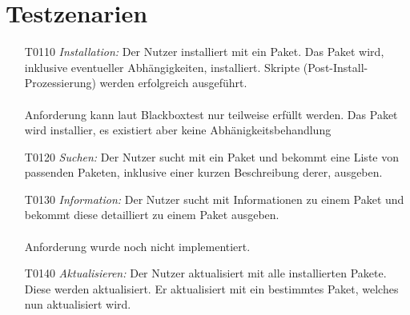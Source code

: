\chapter{Testzenarien}
\begin{itemize}
	\item[T0110] \textit{Installation:}	Der Nutzer installiert mit  ein Paket. Das Paket wird, inklusive eventueller Abhängigkeiten, installiert. Skripte (Post-Install-Prozessierung) werden erfolgreich ausgeführt.\\\\
	Anforderung kann laut Blackboxtest nur teilweise erfüllt werden. Das Paket wird installier, es existiert aber keine Abhänigkeitsbehandlung
	\item[T0120] \textit{Suchen:} Der Nutzer sucht mit  ein Paket und bekommt eine Liste von passenden Paketen, inklusive einer kurzen Beschreibung derer, ausgeben.



	\item[T0130] \textit{Information:} Der Nutzer sucht mit  Informationen zu einem Paket und bekommt diese detailliert zu einem Paket ausgeben.\\\\

	Anforderung wurde noch nicht implementiert.

	\item[T0140] \textit{Aktualisieren:} Der Nutzer aktualisiert mit  alle installierten Pakete. Diese werden aktualisiert. Er aktualisiert mit  ein bestimmtes Paket, welches nun aktualisiert wird.\\\\


\end{itemize}
